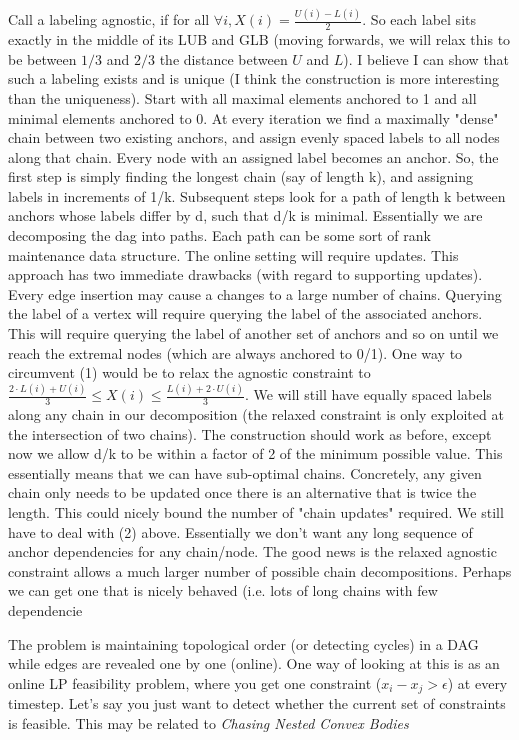 \documentclass[11pt]{article}
\begin{document}
Call a labeling agnostic, if for all $\forall i, X(i) = \frac{U(i)-L(i)}{2}$. So each label sits exactly in the middle of its LUB and GLB
(moving forwards, we will relax this to be between $1/3$ and $2/3$ the distance between $U$ and $L$).
I believe I can show that such a labeling exists and is unique (I think the construction is more interesting than the uniqueness).
Start with all maximal elements anchored to 1 and all minimal elements anchored to 0.
At every iteration we find a maximally "dense" chain between two existing anchors, and assign evenly spaced labels to all nodes along that chain. Every node with an assigned label becomes an anchor.
So, the first step is simply finding the longest chain (say of length k), and assigning labels in increments of 1/k. Subsequent steps look for a path of length k between anchors whose labels differ by d, such that d/k is minimal.
Essentially we are decomposing the dag into paths. Each path can be some sort of rank maintenance data structure. The online setting will require updates.
This approach has two immediate drawbacks (with regard to supporting updates).
Every edge insertion may cause a changes to a large number of chains.
Querying the label of a vertex will require querying the label of the associated anchors. This will require querying the label of another set of anchors and so on until we reach the extremal nodes (which are always anchored to 0/1).
One way to circumvent (1) would be to relax the agnostic constraint to $\frac{2\cdot L(i) + U(i)}{3}\le X(i) \le \frac{L(i) + 2\cdot U(i)}{3}$. We will still have equally spaced labels along any chain in our decomposition (the relaxed constraint is only exploited at the intersection of two chains).
The construction should work as before, except now we allow d/k to be within a factor of 2 of the minimum possible value.
This essentially means that we can have sub-optimal chains. Concretely, any given chain only needs to be updated once there is an alternative that is twice the length.
This could nicely bound the number of "chain updates" required.
We still have to deal with (2) above. Essentially we don't want any long sequence of anchor dependencies for any chain/node.
The good news is the relaxed agnostic constraint allows a much larger number of possible chain decompositions. Perhaps we can get one that is nicely behaved (i.e. lots of long chains with few dependencie


The problem is maintaining topological order (or detecting cycles) in a DAG while edges are revealed one by one (online).
One way of looking at this is as an online LP feasibility problem, where you get one constraint ($x_i - x_j > \epsilon$) at every timestep.
Let's say you just want to detect whether the current set of constraints is feasible.
This may be related to \emph{Chasing Nested Convex Bodies} \cite{nested}



\end{document}
